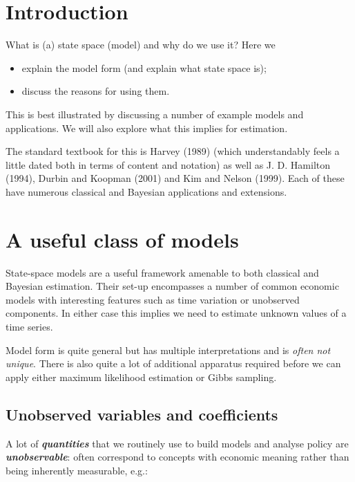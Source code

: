 \documentclass[
  letterpaper,
]{book}
\providecommand{\tightlist}{%
  \setlength{\itemsep}{0pt}\setlength{\parskip}{0pt}}\usepackage{longtable,booktabs,array}
\begin{document}
\hypertarget{introduction-1}{%
\section{Introduction}\label{introduction-1}}

What is (a) state space (model) and why do we use it? Here we

\begin{itemize}
\tightlist
\item
  explain the model form (and explain what state space is);
\item
  discuss the reasons for using them.
\end{itemize}

This is best illustrated by discussing a number of example models and
applications. We will also explore what this implies for estimation.

The standard textbook for this is Harvey (1989) (which understandably
feels a little dated both in terms of content and notation) as well as
J. D. Hamilton (1994), Durbin and Koopman (2001) and Kim and Nelson
(1999). Each of these have numerous classical and Bayesian applications
and extensions.

\hypertarget{a-useful-class-of-models}{%
\section{A useful class of models}\label{a-useful-class-of-models}}

State-space models are a useful framework amenable to both classical and
Bayesian estimation. Their set-up encompasses a number of common
economic models with interesting features such as time variation or
unobserved components. In either case this implies we need to estimate
unknown values of a time series.

Model form is quite general but has multiple interpretations and is
\emph{often not unique}. There is also quite a lot of additional
apparatus required before we can apply either maximum likelihood
estimation or Gibbs sampling.

\hypertarget{unobserved-variables-and-coefficients}{%
\subsection{Unobserved variables and
coefficients}\label{unobserved-variables-and-coefficients}}

A lot of \textbf{\emph{quantities}} that we routinely use to build
models and analyse policy are \textbf{\emph{unobservable}}: often
correspond to concepts with economic meaning rather than being
inherently measurable, e.g.:
\end{document}
